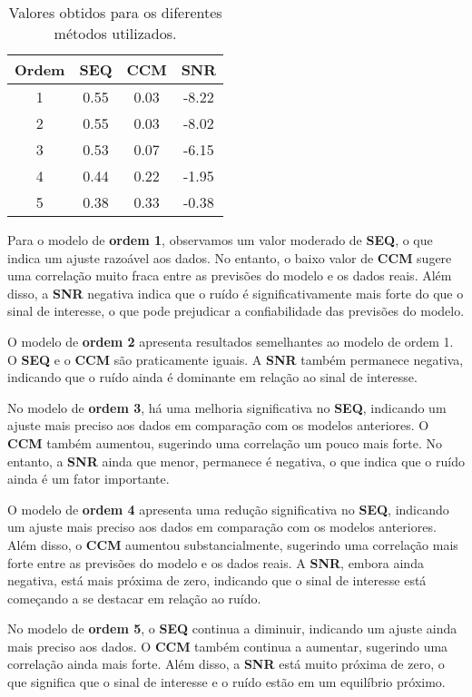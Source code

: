 \documentclass[a4paper,12pt]{article}
\begin{document}
\begin{table}[h!]
    \centering
    \begin{tabular}{|c|c|c|c|}
        \hline
        \textbf{Ordem} & \textbf{SEQ} & \textbf{CCM} & \textbf{SNR} \\
        \hline
        1 & 0.55 & 0.03 & -8.22 \\
        2 & 0.55 & 0.03 & -8.02 \\ 
        3 & 0.53 & 0.07 & -6.15 \\ 
        4 & 0.44 & 0.22 & -1.95 \\
        5 & 0.38 & 0.33 & -0.38 \\
        \hline
    \end{tabular}
    \caption{Valores obtidos para os diferentes métodos utilizados.}
\end{table}

Para o modelo de \textbf{ordem 1}, observamos um valor moderado de \textbf{SEQ}, o que indica um ajuste razoável aos dados. No entanto, o baixo valor de \textbf{CCM} sugere uma correlação muito fraca entre as previsões do modelo e os dados reais. Além disso, a \textbf{SNR} negativa indica que o ruído é significativamente mais forte do que o sinal de interesse, o que pode prejudicar a confiabilidade das previsões do modelo.

O modelo de \textbf{ordem 2} apresenta resultados semelhantes ao modelo de ordem 1. O \textbf{SEQ} e o \textbf{CCM} são praticamente iguais. A \textbf{SNR} também permanece negativa, indicando que o ruído ainda é dominante em relação ao sinal de interesse.

No modelo de \textbf{ordem 3}, há uma melhoria significativa no \textbf{SEQ}, indicando um ajuste mais preciso aos dados em comparação com os modelos anteriores. O \textbf{CCM} também aumentou, sugerindo uma correlação um pouco mais forte. No entanto, a \textbf{SNR} ainda que menor, permanece é negativa, o que indica que o ruído ainda é um fator importante.

O modelo de \textbf{ordem 4} apresenta uma redução significativa no \textbf{SEQ}, indicando um ajuste mais preciso aos dados em comparação com os modelos anteriores. Além disso, o \textbf{CCM} aumentou substancialmente, sugerindo uma correlação mais forte entre as previsões do modelo e os dados reais. A \textbf{SNR}, embora ainda negativa, está mais próxima de zero, indicando que o sinal de interesse está começando a se destacar em relação ao ruído.

No modelo de \textbf{ordem 5}, o \textbf{SEQ} continua a diminuir, indicando um ajuste ainda mais preciso aos dados. O \textbf{CCM} também continua a aumentar, sugerindo uma correlação ainda mais forte. Além disso, a \textbf{SNR} está muito próxima de zero, o que significa que o sinal de interesse e o ruído estão em um equilíbrio próximo.
\end{document}
